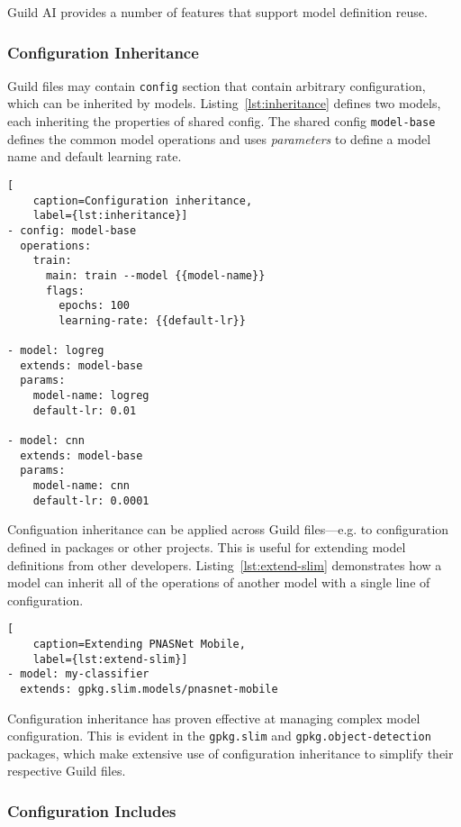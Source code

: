 \documentclass{article}
\begin{document}
Guild AI provides a number of features that support model definition
reuse.

\subsubsection{Configuration Inheritance}

Guild files may contain \verb|config| section that contain arbitrary
configuration, which can be inherited by
models. Listing~\ref{lst:inheritance} defines two models, each
inheriting the properties of shared config. The shared config
\verb|model-base| defines the common model operations and uses
\emph{parameters} to define a model name and default learning rate.

\begin{lstlisting}[
    caption=Configuration inheritance,
    label={lst:inheritance}]
- config: model-base
  operations:
    train:
      main: train --model {{model-name}}
      flags:
        epochs: 100
        learning-rate: {{default-lr}}

- model: logreg
  extends: model-base
  params:
    model-name: logreg
    default-lr: 0.01

- model: cnn
  extends: model-base
  params:
    model-name: cnn
    default-lr: 0.0001
\end{lstlisting}

Configuation inheritance can be applied across Guild files---e.g. to
configuration defined in packages or other projects. This is useful
for extending model definitions from other
developers. Listing~\ref{lst:extend-slim} demonstrates how a model can
inherit all of the operations of another model with a single line of
configuration.

\begin{lstlisting}[
    caption=Extending PNASNet Mobile,
    label={lst:extend-slim}]
- model: my-classifier
  extends: gpkg.slim.models/pnasnet-mobile
\end{lstlisting}

Configuration inheritance has proven effective at managing complex
model configuration. This is evident in the \verb|gpkg.slim| and
\verb|gpkg.object-detection| packages, which make extensive use of
configuration inheritance to simplify their respective Guild files.

\subsubsection{Configuration Includes}
\end{document}
